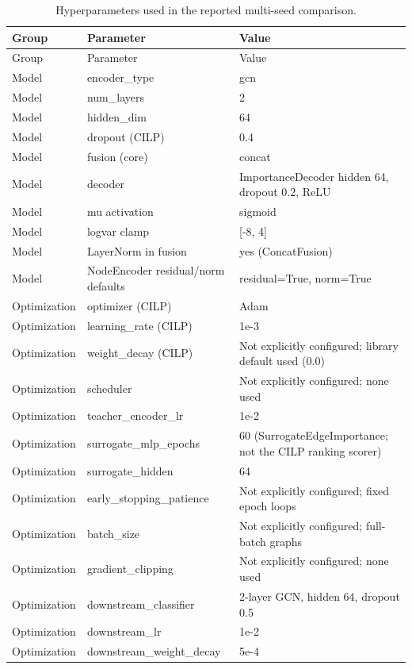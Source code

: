 \begin{center}\scriptsize
\begin{longtable}{@{}p{2.2cm}p{4.2cm}p{6.8cm}@{}}
\caption{Hyperparameters used in the reported multi-seed comparison.}\\
\toprule Group & Parameter & Value \\ \midrule \endfirsthead
\toprule Group & Parameter & Value \\ \midrule \endhead
Model & encoder\_type & gcn \\
Model & num\_layers & 2 \\
Model & hidden\_dim & 64 \\
Model & dropout (CILP) & 0.4 \\
Model & fusion (core) & concat \\
Model & decoder & ImportanceDecoder hidden 64, dropout 0.2, ReLU \\
Model & mu activation & sigmoid \\
Model & logvar clamp & [-8, 4] \\
Model & LayerNorm in fusion & yes (ConcatFusion) \\
Model & NodeEncoder residual/norm defaults & residual=True, norm=True \\
Optimization & optimizer (CILP) & Adam \\
Optimization & learning\_rate (CILP) & 1e-3 \\
Optimization & weight\_decay (CILP) & Not explicitly configured; library default used (0.0) \\
Optimization & scheduler & Not explicitly configured; none used \\
Optimization & teacher\_encoder\_lr & 1e-2 \\
Optimization & surrogate\_mlp\_epochs & 60 (SurrogateEdgeImportance; not the CILP ranking scorer) \\
Optimization & surrogate\_hidden & 64 \\
Optimization & early\_stopping\_patience & Not explicitly configured; fixed epoch loops \\
Optimization & batch\_size & Not explicitly configured; full-batch graphs \\
Optimization & gradient\_clipping & Not explicitly configured; none used \\
Optimization & downstream\_classifier & 2-layer GCN, hidden 64, dropout 0.5 \\
Optimization & downstream\_lr & 1e-2 \\
Optimization & downstream\_weight\_decay & 5e-4 \\

\end{longtable}
\end{center}
